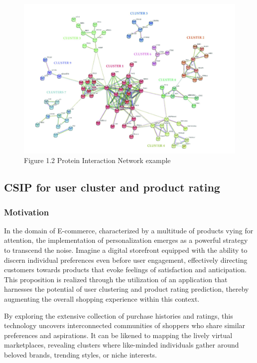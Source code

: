 \begin{center}
\begin{figure}[!htp]
    \centering
    \includegraphics[width=0.8 \textwidth]{image/protein_interaction_example.png}
    \caption{Figure 1.2 Protein Interaction Network example
    }
    \label{subsection}
\end{figure}
\end{center}

\subsection{CSIP for user cluster and product rating}
\subsubsection{Motivation}
In the domain of E-commerce, characterized by a multitude of products vying for attention, the implementation of personalization emerges as a powerful strategy to transcend the noise. 
Imagine a digital storefront equipped with the ability to discern individual preferences even before user engagement, effectively directing customers towards products that evoke feelings of satisfaction and anticipation. 
This proposition is realized through the utilization of an application that harnesses the potential of user clustering and product rating prediction, thereby augmenting the overall shopping experience within this context.

By exploring the extensive collection of purchase histories and ratings, this technology uncovers interconnected communities of shoppers who share similar preferences and aspirations.
It can be likened to mapping the lively virtual marketplaces, revealing clusters where like-minded individuals gather around beloved brands, trending styles, or niche interests.

